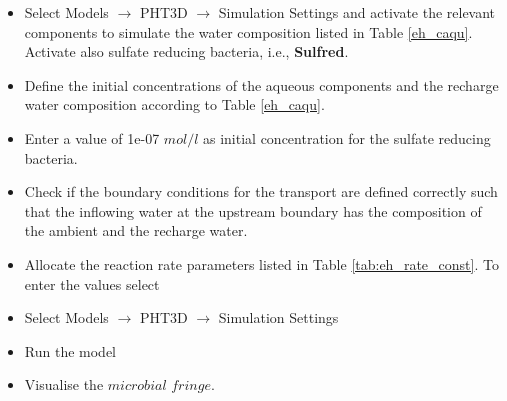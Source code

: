 \begin{itemize}

\item Select Models $\rightarrow$ PHT3D $\rightarrow$ Simulation Settings and
activate the relevant components to simulate the water composition listed in
Table \ref{eh_caqu}. Activate also
sulfate reducing bacteria, i.e., {\color{red} \textbf{Sulfred}}.

\item Define the initial concentrations of the aqueous components
and the recharge water composition according to Table \ref{eh_caqu}.

\item Enter a value of 1e-07 $mol/l$ as initial concentration for 
the sulfate reducing bacteria. 

\item Check if the boundary conditions for the transport are defined correctly 
such that the inflowing water at the upstream boundary has the composition
of the ambient and the recharge water.  

\item Allocate the reaction rate parameters listed in 
Table \ref{tab:eh_rate_const}. To enter the values select
\item Select Models $\rightarrow$ PHT3D $\rightarrow$ Simulation Settings

\item Run the model

\item Visualise the $microbial$ $fringe$.

\end{itemize}

